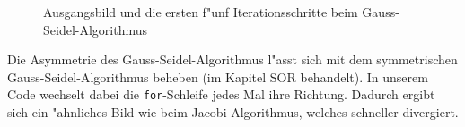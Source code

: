 \begin{refsection}
\begin{figure}
\centering 
{}\quad 
{}\quad 
{} 
\caption{Ausgangsbild und die ersten f"unf Iterationsschritte beim
Gauss-Seidel-Algorithmus\label{potential:gaussseidel}} 
\end{figure}

Die Asymmetrie des Gauss-Seidel-Algorithmus l"asst
sich mit dem symmetrischen Gauss-Seidel-Algorithmus beheben
(im Kapitel SOR behandelt). In unserem Code wechselt dabei die
\texttt{for}-Schleife jedes Mal ihre Richtung. Dadurch ergibt
sich ein "ahnliches Bild wie beim Jacobi-Algorithmus, welches
schneller divergiert. 


\end{refsection}
